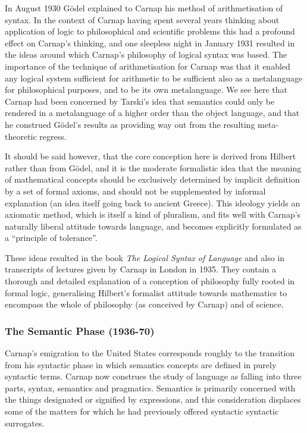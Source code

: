 \documentclass[10pt,titlepage]{book}
\def\ouml{\"o}
\begin{document}
In August 1930 G{\ouml}del explained to Carnap his method of arithmetisation of syntax.
In the context of Carnap having spent several years thinking about application of logic to philosophical and scientific problems this had a profound effect on Carnap's thinking, and one sleepless night in January 1931 resulted in the ideas around which Carnap's philosophy of logical syntax was based.
The importance of the technique of arithmetisation for Carnap was that it enabled any logical system sufficient for arithmetic to be sufficient also as a metalanguage for philosophical purposes, and to be its own metalanguage.
We see here that Carnap had been concerned by Tarski's idea that semantics could only be rendered in a metalanguage of a higher order than the object language, and that he construed G{\ouml}del's results as providing way out from the resulting meta-theoretic regress.

It should be said however, that the core conception here is derived from Hilbert rather than from G{\ouml}del, and it is the moderate formalistic idea that the meaning of mathematical concepts should be exclusively determined by implicit definition by a set of formal axioms, and should not be supplemented by informal explanation (an idea itself going back to ancient Greece).
This ideology yields an axiomatic method, which is itself a kind of pluralism, and fits well with Carnap's naturally liberal attitude towards language, and becomes explicitly formulated as a ``principle of tolerance''.

These ideas resulted in the book \emph{The Logical Syntax of Language} \cite{carnap34,carnap37} and also in transcripts \cite{carnap35} of lectures given by Carnap in London in 1935.
They contain a thorough and detailed explanation of a conception of philosophy fully rooted in formal logic, generalising Hilbert's formalist attitude towards mathematics to encompass the whole of philosophy (as conceived by Carnap) and of science.

\subsubsection{The Semantic Phase (1936-70)}

Carnap's emigration to the United States corresponds roughly to the transition from his syntactic phase in which semantics concepts are defined in purely syntactic terms.
Carnap now construes the study of language as falling into three parts, syntax, semantics and pragmatics.
Semantics is primarily concerned with the things designated or signified by expressions, and this consideration displaces some of the matters for which he had previously offered syntactic syntactic surrogates.
\end{document}

